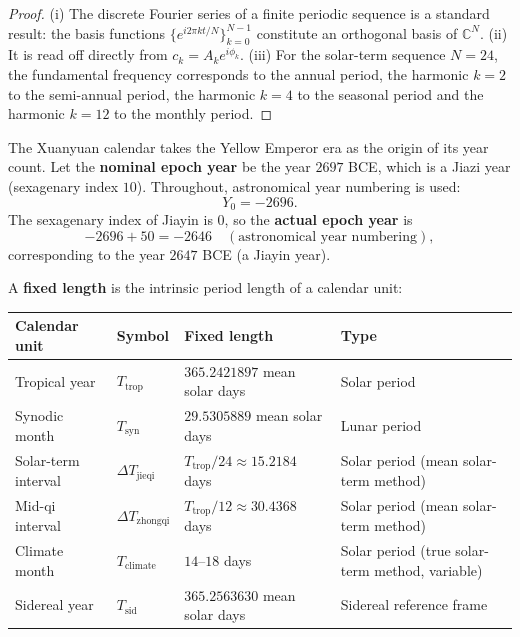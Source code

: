 \begin{proof}
(i) The discrete Fourier series of a finite periodic sequence is a standard result: the basis functions \(\{e^{i2\pi kt/N}\}_{k=0}^{N-1}\) constitute an orthogonal basis of \(\mathbb C^N\).
(ii) It is read off directly from \(c_k=A_k e^{i\phi_k}\).
(iii) For the solar-term sequence \(N=24\), the fundamental frequency corresponds to the annual period, the harmonic \(k=2\) to the semi-annual period, the harmonic \(k=4\) to the seasonal period and the harmonic \(k=12\) to the monthly period.
\end{proof}

\begin{definition}\label{def:xuanyuan_epoch}
The Xuanyuan calendar takes the Yellow Emperor era as the origin of its year count. Let the \textbf{nominal epoch year} be the year \(2697\) BCE, which is a Jiazi year (sexagenary index \(10\)). Throughout, astronomical year numbering is used:
\[
Y_0=-2696.
\]
The sexagenary index of Jiayin is \(0\), so the \textbf{actual epoch year} is
\[
-2696+50=-2646\quad(\text{astronomical year numbering}),
\]
corresponding to the year \(2647\) BCE (a Jiayin year).
\end{definition}

\begin{definition}\label{def:fixed_length}
A \textbf{fixed length} is the intrinsic period length of a calendar unit:
\begin{center}
\begin{tabular}{>{\centering\arraybackslash}p{2.5cm}>{\centering\arraybackslash}p{2.5cm}>{\centering\arraybackslash}p{2.5cm}>{\centering\arraybackslash}p{3cm}}
\toprule
Calendar unit & Symbol & Fixed length & Type \\
\midrule
Tropical year & \(T_{\text{trop}}\) & \(365.2421897\) mean solar days & Solar period \\
Synodic month & \(T_{\text{syn}}\) & \(29.5305889\) mean solar days & Lunar period \\
Solar-term interval & \(\Delta T_{\text{jieqi}}\) & \(T_{\text{trop}}/24\approx 15.2184\) days & Solar period (mean solar-term method) \\
Mid-qi interval & \(\Delta T_{\text{zhongqi}}\) & \(T_{\text{trop}}/12\approx 30.4368\) days & Solar period (mean solar-term method) \\
Climate month & \(T_{\text{climate}}\) & \(14\)--\(18\) days & Solar period (true solar-term method, variable) \\
Sidereal year & \(T_{\text{sid}}\) & \(365.2563630\) mean solar days & Sidereal reference frame \\
\bottomrule
\end{tabular}
\end{center}
\end{definition}


